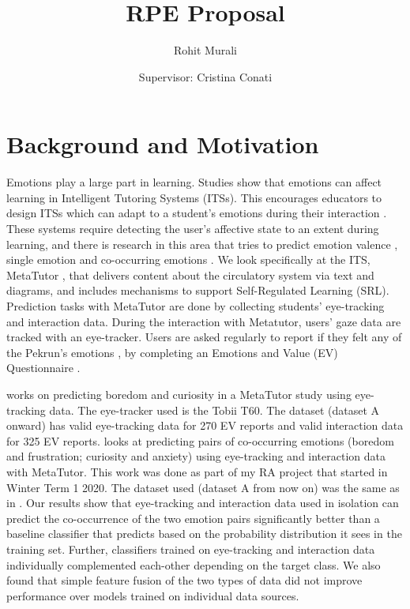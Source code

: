 \documentclass[10pt,letterpaper]{article}
\title{\huge \textbf{RPE Proposal}}
\date{}
\author{Rohit Murali \and Supervisor: Cristina Conati}
\begin{document}
\maketitle

\section{Background and Motivation}

Emotions play a large part in learning. Studies  \autocite{baker2010better, wortha2019multiple} show that emotions can affect learning in Intelligent Tutoring Systems (ITSs). This encourages educators to design ITSs which can adapt to a student's emotions during their interaction \autocite{woolf2009affect, grawemeyer2016affecting}. These systems require detecting the user's affective state to an extent during learning, and there is research in this area that tries to predict emotion valence \autocite{lalle2018prediction, salmeron2014evaluation}, single emotion \autocite{jaques2014predicting, sims2020neural, woolf2009affect, paquette2014sensor, sabourin2011modeling, lalle2016predicting} and co-occurring emotions \autocite{lalle2021predict}.
We look specifically at the ITS, MetaTutor \autocite{azevedo2013using}, that delivers content about the circulatory system via text and diagrams, and includes mechanisms to support Self-Regulated Learning (SRL). Prediction tasks with MetaTutor are done by collecting students' eye-tracking and interaction data. During the interaction with Metatutor, users' gaze data are tracked with an eye-tracker. Users are asked regularly to report if they felt any of the Pekrun’s emotions \autocite{pekrun2014self}, by completing an Emotions and Value (EV) Questionnaire \autocite{azevedo2013using}.

\cite{jaques2014predicting} works on predicting boredom and curiosity in a MetaTutor study using eye-tracking data. The eye-tracker used is the Tobii T60. The dataset (dataset A onward) has valid eye-tracking data for 270 EV reports and valid interaction data for 325 EV reports.
\cite{lalle2021predict} looks at predicting pairs of co-occurring emotions (boredom and frustration; curiosity and anxiety) using eye-tracking and interaction data with MetaTutor. This work was done as part of my RA project that started in Winter Term 1 2020. The dataset used (dataset A from now on) was the same as in \cite{jaques2014predicting}. Our results show that eye-tracking and interaction data used in isolation can predict the co-occurrence of the two emotion pairs significantly better than a baseline classifier that predicts based on the probability distribution it sees in the training set. Further, classifiers trained on eye-tracking and interaction data individually complemented each-other depending on the target class.
We also found that simple feature fusion of the two types of data did not improve performance over models trained on individual data sources.
\end{document}
